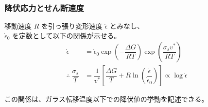 \documentclass[10pt, dvipdfmx]{beamer}
\begin{document}
\begin{frame}
\frametitle{降伏応力とせん断速度}

\large
移動速度 $R$ を引っ張り変形速度 $\dot{\epsilon}$ とみなし、\\ $\dot{\epsilon}_0$ を定数として以下の関係が示せる。
\normalsize
	\begin{align*}
	\dot{\epsilon} 
	&= \dot{\epsilon}_0 \exp \left( - \dfrac{\Delta G}{RT} \right) 
		\exp \left( \dfrac{ \sigma_s v^*}{RT} \right) \\
	\therefore \; \dfrac{\sigma_s}{T} 
	&= \dfrac{1}{v^*} 
		\left[
			\dfrac{\Delta G}{T} 
			+ R \ln 
			\left(
			\dfrac{\dot{\epsilon}}{\dot{\epsilon}_0} 
			\right) 
		\right] 
	\propto \log \dot{\epsilon}
	\end{align*}

\large

この関係は、ガラス転移温度以下での降伏値の挙動を記述できる。
\end{frame}
\end{document}
